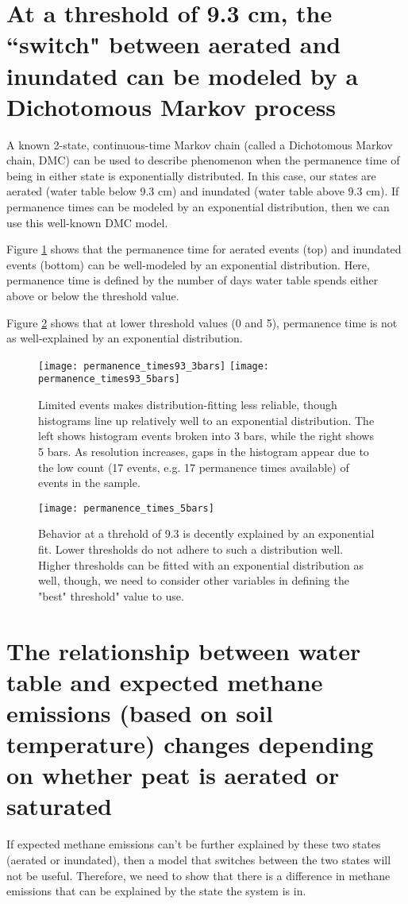 \documentclass[12 pt]{article}
\begin{document}
%
\section{At a threshold of 9.3 cm, the ``switch" between aerated and inundated can be modeled by a Dichotomous Markov process}
A known 2-state, continuous-time Markov chain (called a Dichotomous Markov chain, DMC) can be used to describe phenomenon when the permanence time of being in either state is exponentially distributed. In this case, our states are aerated (water table below 9.3 cm) and inundated (water table above 9.3 cm). If permanence times can be modeled by an exponential distribution, then we can use this well-known DMC model.  

Figure \ref{9.3_35bars} shows that the permanence time for aerated events (top) and inundated events (bottom) can be well-modeled by an exponential distribution. Here, permanence time is defined by the number of days water table spends either above or below the threshold value. 

Figure \ref{hists_thres} shows that at lower threshold values (0 and 5), permanence time is not as well-explained by an exponential distribution. 

\begin{figure}[!htb]
\centering
\texttt{[image: permanence\_times93\_3bars]}
\texttt{[image: permanence\_times93\_5bars]}
\caption{Limited events makes distribution-fitting less reliable, though histograms line up relatively well to an exponential distribution. The left shows histogram events broken into 3 bars, while the right shows 5 bars. As resolution increases, gaps in the histogram appear due to the low count (17 events, e.g. 17 permanence times available) of events in the sample.  }\label{9.3_35bars}
\end{figure}

\begin{figure}[!htb]
\centering
\texttt{[image: permanence\_times\_5bars]}
\caption{Behavior at a threhold of 9.3 is decently explained by an exponential fit. Lower thresholds do not adhere to such a distribution well. Higher thresholds can be fitted with an exponential distribution as well, though, we need to consider other variables in defining the "best" threshold" value to use.  }\label{hists_thres}
\end{figure}

\section{The relationship between water table and expected methane emissions (based on soil temperature) changes depending on whether peat is aerated or saturated}
If expected methane emissions can't be further explained by these two states (aerated or inundated), then a model that switches between the two states will not be useful. Therefore, we need to show that there is a difference in methane emissions that can be explained by the state the system is in. 
\end{document}
